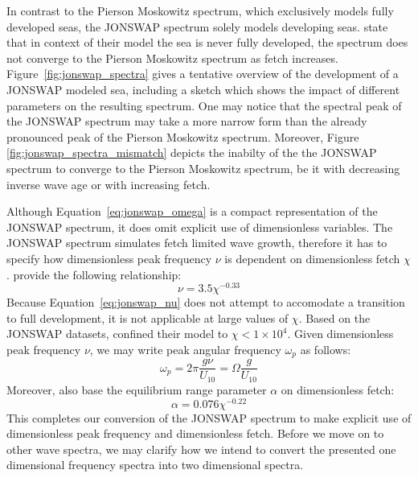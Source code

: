 In contrast to the Pierson Moskowitz spectrum, which exclusively models fully 
developed seas, the JONSWAP spectrum solely models developing seas.
\citeauthor{article:Hasselman1973} state that in context of their model the sea is never fully developed, 
the spectrum does not converge to the Pierson Moskowitz spectrum as fetch 
increases. Figure~\ref{fig:jonswap_spectra} gives a tentative overview of the 
development of a JONSWAP modeled sea, including a sketch which shows the impact 
of different parameters on the resulting spectrum. One may notice that the 
spectral peak of the JONSWAP spectrum may take a more narrow form than the 
already pronounced peak of the Pierson Moskowitz spectrum. Moreover, Figure 
\ref{fig:jonswap_spectra_mismatch} depicts the inabilty of the the JONSWAP 
spectrum to converge to the Pierson Moskowitz spectrum, be it with decreasing 
inverse wave age or with increasing fetch.

Although Equation~\ref{eq:jonswap_omega} is a compact representation of the
JONSWAP spectrum, it does omit explicit use of dimensionless variables.
The JONSWAP spectrum simulates fetch limited wave growth, therefore it has to
specify how dimensionless peak frequency $\nu$ is dependent on dimensionless
fetch $\chi$. \citeauthor{article:Hasselman1973} provide the following relationship:
\begin{equation}
\label{eq:jonswap_nu}
 \nu = 3.5\chi^{-0.33}
\end{equation}
Because Equation~\ref{eq:jonswap_nu} does not attempt to accomodate a transition 
to full development, it is not applicable at large values of $\chi$. Based on 
the JONSWAP datasets, \citeauthor{article:Hasselman1973} confined their model
to $\chi < 1\times10^4$. Given dimensionless peak frequency $\nu$, we may write
peak  angular frequency $\omega_p$ as follows:
\begin{equation*}
 \omega_p = 2\pi\frac{g\nu}{U_{10}} = \Omega\frac{g}{U_{10}}
\end{equation*}
Moreover, \citeauthor{article:Hasselman1973} also base the equilibrium range
parameter $\alpha$ on dimensionless fetch:
\begin{equation*}
 \alpha = 0.076 \chi^{-0.22}
\end{equation*}
%
This completes our conversion of the JONSWAP spectrum to make explicit use of 
dimensionless peak frequency and dimensionless fetch.
Before we move on to other wave spectra, we may clarify how we intend to
convert the presented one dimensional frequency spectra into two dimensional
\wavenumber spectra.
%
